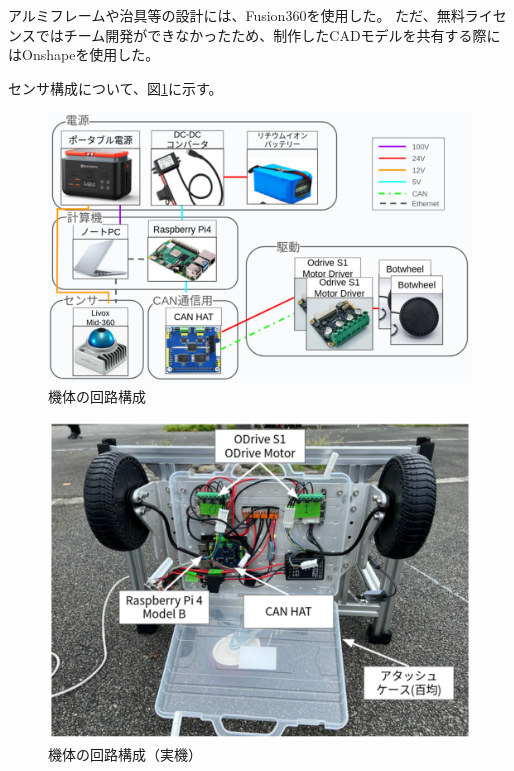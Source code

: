 \documentclass[twocolumn,9pt]{jsproceedings}
\begin{document}
アルミフレームや治具等の設計には、Fusion360\cite{Fusion360}を使用した。
ただ、無料ライセンスではチーム開発ができなかったため、制作したCADモデルを共有する際にはOnshape\cite{Onshape}を使用した。


センサ構成について、図\ref{fig:botwheel-explorer-schematic}に示す。
\begin{figure}[h]
  \begin{center}
    \includegraphics[width=1.0\linewidth]{figs/botwheel-explorer-schematic.pdf}
    \caption{機体の回路構成}
    \label{fig:botwheel-explorer-schematic}
  \end{center}
\end{figure}

\begin{figure}[h]
  \begin{center}
    \includegraphics[width=1.0\linewidth]{figs/trainee_under.pdf}
    \caption{機体の回路構成（実機）}
    \label{fig:trainee_under}
  \end{center}
\end{figure}
\end{document}

